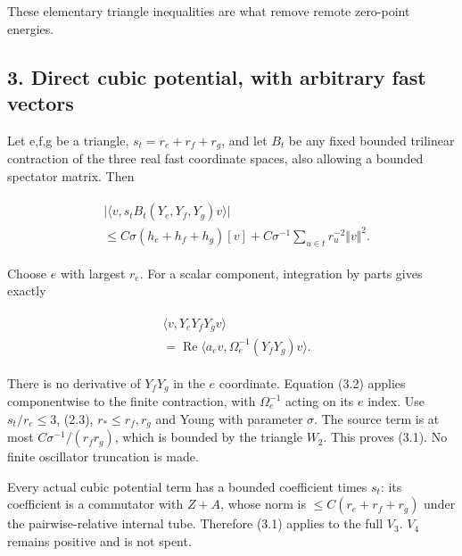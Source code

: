 These elementary triangle inequalities are what remove remote zero-point
energies.

\subsection{3. Direct cubic potential, with arbitrary fast
vectors}\label{h-direct-cubic-potential-with-arbitrary-fast-vectors}

Let e,f,g be a triangle, \(s_{t}=r_{e}+r_{f}+r_{g}\), and let \(B_{t}\)
be any fixed bounded trilinear contraction of the three real fast
coordinate spaces, also allowing a bounded spectator matrix. Then

\begin{gather*}
\begin{aligned}
& \vert \langle v,s_{t} B_{t}(Y_{e},Y_{f},Y_{g})v\rangle \vert \\
& \le C \sigma  (h_{e}+h_{f}+h_{g})[v]+C \sigma ^{-1} \sum _{u \in  t}r_{u}^{-2}\Vert v\Vert ^{2}.
\end{aligned}\tag{3.1}
\end{gather*}

Choose \(e\) with largest \(r_{e}\). For a scalar component, integration
by parts gives exactly

\begin{gather*}
\begin{aligned}
& \langle v,Y_{e} Y_{f} Y_{g} v\rangle \\
& =\operatorname{Re} \langle a_{e} v, \Omega _{e}^{-1}(Y_{f} Y_{g})v\rangle .
\end{aligned}\tag{3.2}
\end{gather*}

There is no derivative of \(Y_{f} Y_{g}\) in the \(e\) coordinate.
Equation (3.2) applies componentwise to the finite contraction, with
\(\Omega _{e}^{-1}\) acting on its \(e\) index. Use
\(s_{t}/r_{e}\le 3\), (2.3), \(r_{*}\le r_{f},r_{g}\) and Young with
parameter \(\sigma\). The source term is at most
\(C \sigma ^{-1}/(r_{f} r_{g})\), which is bounded by the triangle
\(W_{2}\). This proves (3.1). No finite oscillator truncation is made.

Every actual cubic potential term has a bounded coefficient times
\(s_{t}\): its coefficient is a commutator with \(Z+A\), whose norm is
\(\le C(r_{e}+r_{f}+r_{g})\) under the pairwise-relative internal tube.
Therefore (3.1) applies to the full \(V_{3}\). \(V_{4}\) remains
positive and is not spent.

